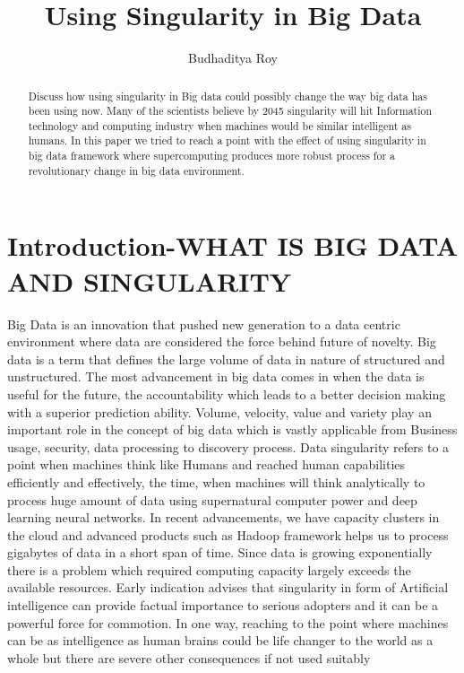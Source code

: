 \documentclass[sigconf]{acmart}
\begin{document}
\title{Using Singularity in Big Data}


\author{Budhaditya Roy}

\renewcommand{\shortauthors}{B.Roy.}


\begin{abstract}
Discuss how using singularity in Big data could possibly change the way big data has been using now. Many of the scientists believe by 2045 singularity will hit Information technology and computing industry when machines would be similar intelligent as humans. In this paper we tried to reach a point with the effect of using singularity in big data framework where supercomputing produces more robust process for a revolutionary change in big data environment. 
\end{abstract}



\maketitle

\section{Introduction-WHAT IS BIG DATA AND SINGULARITY}
Big Data is an innovation that pushed new generation to a data centric environment where data are considered the force behind future of novelty. Big data is a term that defines the large volume of data in nature of structured and unstructured. The most advancement in big data comes in when the data is useful for the future, the accountability which leads to a better decision making with a superior prediction ability. Volume, velocity, value and variety play an important role in the concept of big data which is vastly applicable from Business usage, security, data processing to discovery process. \cite{editor01} Data singularity refers to a point when machines think like Humans and reached human capabilities efficiently and effectively, the time, when machines will think analytically to process huge amount of data using supernatural computer power and deep learning neural networks. In recent advancements, we have capacity clusters in the cloud and advanced products such as Hadoop framework helps us to process gigabytes of data in a short span of time. Since data is growing exponentially there is a problem which required computing capacity largely exceeds the available resources. Early indication advises that singularity in form of Artificial intelligence can provide factual importance to serious adopters and it can be a powerful force for commotion. \cite{editor01}In one way, reaching to the point where machines can be as intelligence as human brains could be life changer to the world as a whole but there are severe other consequences if not used suitably
\end{document}
